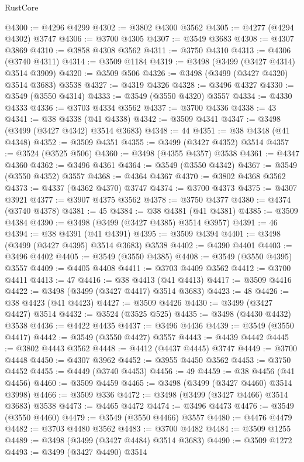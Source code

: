 \begin{lexlean}{RustCore}
\begin{coremodule}
@4300 := @4296 @4299
@4302 := @3802 @4300 @3562
@4305 := @4277 (@4294 @4302) @3747
@4306 := @3700 @4305
@4307 := @3549 @3683
@4308 := @4307 @3869
@4310 := @3858 @4308 @3562
@4311 := @3750 @4310
@4313 := @4306 (@3740 @4311)
@4314 := @3509 @1184
@4319 := @3498 (@3499 (@3427 @4314) @3514 @3909)
@4320 := @3509 @506
@4326 := @3498 (@3499 (@3427 @4320) @3514 @3683) @3538
@4327 := @4319 @4326
@4328 := @3496 @4327
@4330 := @3549 (@3550 @4314)
@4333 := @3549 (@3550 @4320) @3557
@4334 := @4330 @4333
@4336 := @3703 @4334 @3562
@4337 := @3700 @4336
@4338 := 43
@4341 := @38 @4338 (@41 @4338)
@4342 := @3509 @4341
@4347 := @3498 (@3499 (@3427 @4342) @3514 @3683)
@4348 := 44
@4351 := @38 @4348 (@41 @4348)
@4352 := @3509 @4351
@4355 := @3499 (@3427 @4352) @3514
@4357 := @3524 (@3525 @506)
@4360 := @3498 (@4355 @4357) @3538
@4361 := @4347 @4360
@4362 := @3496 @4361
@4364 := @3549 (@3550 @4342)
@4367 := @3549 (@3550 @4352) @3557
@4368 := @4364 @4367
@4370 := @3802 @4368 @3562
@4373 := @4337 (@4362 @4370) @3747
@4374 := @3700 @4373
@4375 := @4307 @3921
@4377 := @3907 @4375 @3562
@4378 := @3750 @4377
@4380 := @4374 (@3740 @4378)
@4381 := 45
@4384 := @38 @4381 (@41 @4381)
@4385 := @3509 @4384
@4390 := @3498 (@3499 (@3427 @4385) @3514 @3957)
@4391 := 46
@4394 := @38 @4391 (@41 @4391)
@4395 := @3509 @4394
@4401 := @3498 (@3499 (@3427 @4395) @3514 @3683) @3538
@4402 := @4390 @4401
@4403 := @3496 @4402
@4405 := @3549 (@3550 @4385)
@4408 := @3549 (@3550 @4395) @3557
@4409 := @4405 @4408
@4411 := @3703 @4409 @3562
@4412 := @3700 @4411
@4413 := 47
@4416 := @38 @4413 (@41 @4413)
@4417 := @3509 @4416
@4422 := @3498 (@3499 (@3427 @4417) @3514 @3683)
@4423 := 48
@4426 := @38 @4423 (@41 @4423)
@4427 := @3509 @4426
@4430 := @3499 (@3427 @4427) @3514
@4432 := @3524 (@3525 @525)
@4435 := @3498 (@4430 @4432) @3538
@4436 := @4422 @4435
@4437 := @3496 @4436
@4439 := @3549 (@3550 @4417)
@4442 := @3549 (@3550 @4427) @3557
@4443 := @4439 @4442
@4445 := @3802 @4443 @3562
@4448 := @4412 (@4437 @4445) @3747
@4449 := @3700 @4448
@4450 := @4307 @3962
@4452 := @3955 @4450 @3562
@4453 := @3750 @4452
@4455 := @4449 (@3740 @4453)
@4456 := 49
@4459 := @38 @4456 (@41 @4456)
@4460 := @3509 @4459
@4465 := @3498 (@3499 (@3427 @4460) @3514 @3998)
@4466 := @3509 @336
@4472 := @3498 (@3499 (@3427 @4466) @3514 @3683) @3538
@4473 := @4465 @4472
@4474 := @3496 @4473
@4476 := @3549 (@3550 @4460)
@4479 := @3549 (@3550 @4466) @3557
@4480 := @4476 @4479
@4482 := @3703 @4480 @3562
@4483 := @3700 @4482
@4484 := @3509 @1255
@4489 := @3498 (@3499 (@3427 @4484) @3514 @3683)
@4490 := @3509 @1272
@4493 := @3499 (@3427 @4490) @3514

\end{coremodule}
\end{lexlean}
